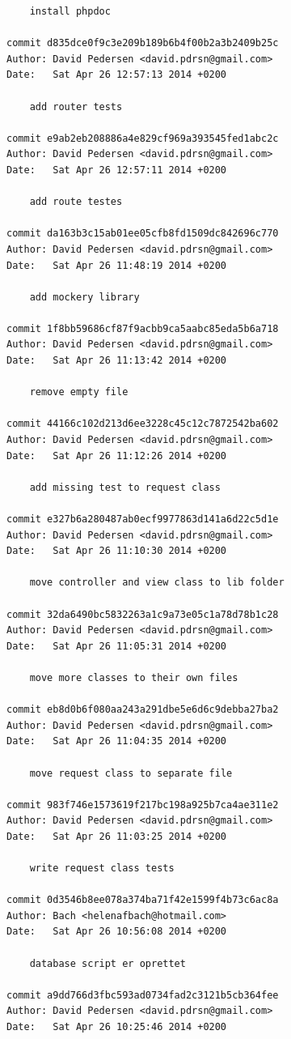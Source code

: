 \documentclass[12pt]{article}
\begin{document}
\begin{verbatim}
    install phpdoc

commit d835dce0f9c3e209b189b6b4f00b2a3b2409b25c
Author: David Pedersen <david.pdrsn@gmail.com>
Date:   Sat Apr 26 12:57:13 2014 +0200

    add router tests

commit e9ab2eb208886a4e829cf969a393545fed1abc2c
Author: David Pedersen <david.pdrsn@gmail.com>
Date:   Sat Apr 26 12:57:11 2014 +0200

    add route testes

commit da163b3c15ab01ee05cfb8fd1509dc842696c770
Author: David Pedersen <david.pdrsn@gmail.com>
Date:   Sat Apr 26 11:48:19 2014 +0200

    add mockery library

commit 1f8bb59686cf87f9acbb9ca5aabc85eda5b6a718
Author: David Pedersen <david.pdrsn@gmail.com>
Date:   Sat Apr 26 11:13:42 2014 +0200

    remove empty file

commit 44166c102d213d6ee3228c45c12c7872542ba602
Author: David Pedersen <david.pdrsn@gmail.com>
Date:   Sat Apr 26 11:12:26 2014 +0200

    add missing test to request class

commit e327b6a280487ab0ecf9977863d141a6d22c5d1e
Author: David Pedersen <david.pdrsn@gmail.com>
Date:   Sat Apr 26 11:10:30 2014 +0200

    move controller and view class to lib folder

commit 32da6490bc5832263a1c9a73e05c1a78d78b1c28
Author: David Pedersen <david.pdrsn@gmail.com>
Date:   Sat Apr 26 11:05:31 2014 +0200

    move more classes to their own files

commit eb8d0b6f080aa243a291dbe5e6d6c9debba27ba2
Author: David Pedersen <david.pdrsn@gmail.com>
Date:   Sat Apr 26 11:04:35 2014 +0200

    move request class to separate file

commit 983f746e1573619f217bc198a925b7ca4ae311e2
Author: David Pedersen <david.pdrsn@gmail.com>
Date:   Sat Apr 26 11:03:25 2014 +0200

    write request class tests

commit 0d3546b8ee078a374ba71f42e1599f4b73c6ac8a
Author: Bach <helenafbach@hotmail.com>
Date:   Sat Apr 26 10:56:08 2014 +0200

    database script er oprettet

commit a9dd766d3fbc593ad0734fad2c3121b5cb364fee
Author: David Pedersen <david.pdrsn@gmail.com>
Date:   Sat Apr 26 10:25:46 2014 +0200


\end{verbatim}
\end{document}
